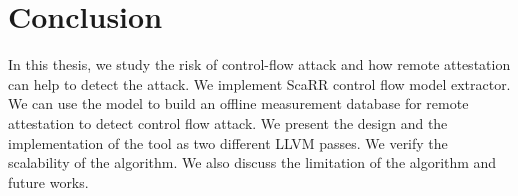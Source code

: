 
\chapter{Conclusion} %

\label{Chapter7} %

In this thesis, we study the risk of control-flow attack and how remote
attestation can help to detect the attack. We implement ScaRR control flow model
extractor. We can use the model to build an offline measurement database for
remote attestation to detect control flow attack. We present the design and the
implementation of the tool as two different LLVM passes. We verify the
scalability of the algorithm. We also discuss the limitation of the algorithm
and future works.
